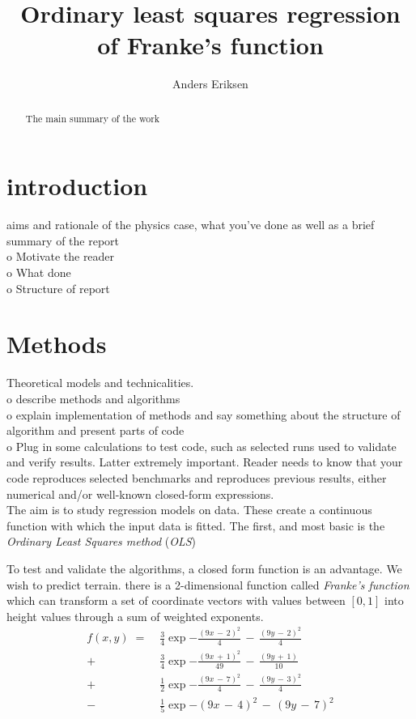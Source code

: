 \documentclass[ 12pt, a4paper ]{article}
\title{Ordinary least squares regression of Franke's function}
\author{Anders Eriksen}
\date{}
\begin{document}
\maketitle
\tableofcontents
\listoffigures
\listoftables
\begin{abstract}
    The main summary of the work
\end{abstract}

\section{introduction}
    aims and rationale of the physics case, what you've done as well as a brief summary of 
the report \\
    o   Motivate the reader\\
    o   What done\\
    o   Structure of report\\
\section{Methods}
    Theoretical models and technicalities. \\
    o   describe methods and algorithms\\
    o   explain implementation of methods and say something about the structure of
        algorithm and present parts of code\\
    o   Plug in some calculations to test code, such as selected runs used to validate and
        verify results. Latter extremely important. Reader needs to know that your code
        reproduces selected benchmarks and reproduces previous results, either numerical 
        and/or well-known closed-form expressions. \\

The aim is to study regression models on data. These create a continuous function with which
the input data is fitted. The first, and most basic is the \textit{Ordinary Least Squares method} 
(\textit{OLS})

To test and validate the algorithms, a closed form function is an advantage. We wish to predict
terrain. there is a 2-dimensional function called \textit{Franke's function}\cite{} which can 
transform a set of coordinate vectors with values between $[0, 1]$ into height values through 
a sum of weighted exponents. 
\begin{align}
    f(x, y) \;=\; 
        &\frac{3}{4} \exp{ - \frac{(9x \,-\, 2)^2}{4}    \,-\, \frac{(9y \,-\, 2)^2}{4} }
    \nonumber \\
    +   &\frac{3}{4} \exp{ - \frac{(9x \,+\, 1)^2}{49}   \,-\, \frac{(9y \,+\, 1)  }{10} }
    \nonumber \\
    +   &\frac{1}{2} \exp{ - \frac{(9x \,-\, 7)^2}{4}    \,-\, \frac{(9y \,-\, 3)^2}{4} }
    \nonumber \\
    -   &\frac{1}{5} \exp{ -       (9x \,-\, 4)^2        \,-\,       (9y \,-\, 7)^2     }
\end{align}
\end{document}

